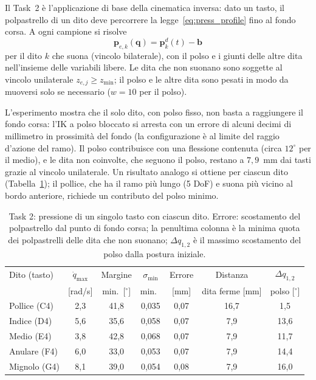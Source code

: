 Il Task~2 \`e l'applicazione di base della cinematica inversa: dato un tasto, il polpastrello di un dito deve percorrere la legge~\eqref{eq:press_profile} fino al fondo corsa.
A ogni campione si risolve
\begin{equation}
    \boldsymbol p_{e,k}(\boldsymbol q)=\boldsymbol p_k^d(t)-\boldsymbol b
\end{equation}
per il dito $k$ che suona (vincolo bilaterale), con il polso e i giunti delle altre dita nell'insieme delle variabili libere. Le dita che non suonano sono soggette al vincolo unilaterale $z_{e,j}\ge z_{\min}$; il polso e le altre dita sono pesati in modo da muoversi solo se necessario ($w=10$ per il polso).

L'esperimento mostra che il solo dito, con polso fisso, non basta a raggiungere il fondo corsa: l'IK a polso bloccato si arresta con un errore di alcuni decimi di millimetro in prossimit\`a del fondo (la configurazione \`e al limite del raggio d'azione del ramo). Il polso contribuisce con una flessione contenuta (circa $12^\circ$ per il medio), e le dita non coinvolte, che seguono il polso, restano a $7{,}9$~mm dai tasti grazie al vincolo unilaterale. Un risultato analogo si ottiene per ciascun dito (Tabella~\ref{tab:task2}); il pollice, che ha il ramo pi\`u lungo (5 DoF) e suona pi\`u vicino al bordo anteriore, richiede un contributo del polso minimo.

\begin{table}[htbp]
    \centering
    \renewcommand{\arraystretch}{1.1}
    \begin{tabular}{|l|c|c|c|c|c|c|}
        \hline
        Dito (tasto) & $\dot q_{\max}$ & Margine & $\sigma_{\min}$ & Errore & Distanza & $\Delta q_{1,2}$\\
         & [rad/s] & min.\ [$^\circ$] & min.\ & [mm] & dita ferme [mm] & polso [$^\circ$]\\ \hline \hline
        Pollice (C4) & 2,3 & 41,8 & 0,035 & 0,07 & 16,7 & 1,5\\
        Indice (D4) & 5,6 & 35,6 & 0,058 & 0,07 & 7,9 & 13,6\\
        Medio (E4) & 3,8 & 42,8 & 0,068 & 0,07 & 7,9 & 11,7\\
        Anulare (F4) & 6,0 & 33,0 & 0,053 & 0,07 & 7,9 & 14,4\\
        Mignolo (G4) & 8,1 & 39,0 & 0,054 & 0,08 & 7,9 & 16,0\\ \hline
    \end{tabular}
    \caption{Task 2: pressione di un singolo tasto con ciascun dito. Errore: scostamento del polpastrello dal punto di fondo corsa; la penultima colonna \`e la minima quota dei polpastrelli delle dita che non suonano; $\Delta q_{1,2}$ \`e il massimo scostamento del polso dalla postura iniziale.}
    \label{tab:task2}
\end{table}

